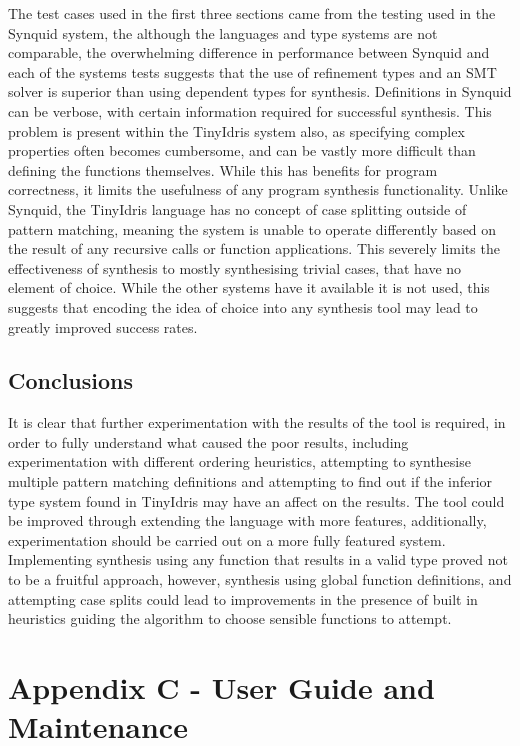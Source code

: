 \documentclass[a4paper]{article}
\begin{document}
The test cases used in the first three sections came from the testing
used in the Synquid system, the although the languages and type systems
are not comparable, the overwhelming difference in performance between
Synquid and each of the systems tests suggests that the use of
refinement types and an SMT solver is superior than using dependent
types for synthesis. Definitions in Synquid can be verbose, with
certain information required for successful synthesis. This problem is
present within the TinyIdris system also, as specifying complex
properties often becomes cumbersome, and can be vastly more difficult
than defining the functions themselves. While this has benefits for
program correctness, it limits the usefulness of any program synthesis
functionality. Unlike Synquid, the TinyIdris language has no concept of
case splitting outside of pattern matching,
meaning the system is unable to operate differently based on the result
of any recursive calls or function applications. This severely limits
the effectiveness of synthesis to mostly synthesising trivial cases,
that have no element of choice. While the other systems have it
available it is not used, this suggests that encoding the idea of
choice into any synthesis tool may lead to greatly improved success
rates.


\subsection{Conclusions}
It is clear that further experimentation with the results of the
tool is required, in order to fully understand what caused the poor
results, including experimentation with different ordering heuristics,
attempting to synthesise multiple pattern matching definitions and
attempting to find out if the inferior type system found in TinyIdris
may have an affect on the results. The tool could be improved through
extending the language with more features, additionally,
experimentation should be carried out on a more fully featured system.
Implementing synthesis using any function that results in a valid type
proved not to be a fruitful approach, however, synthesis using
global function definitions, and attempting case splits could lead to
improvements in the presence of built in heuristics guiding the
algorithm to choose sensible functions to attempt.
\nocite{*}
  
\clearpage

\label{sec:org30d868f}
\clearpage

\section{Appendix C - User Guide and Maintenance}
\end{document}
